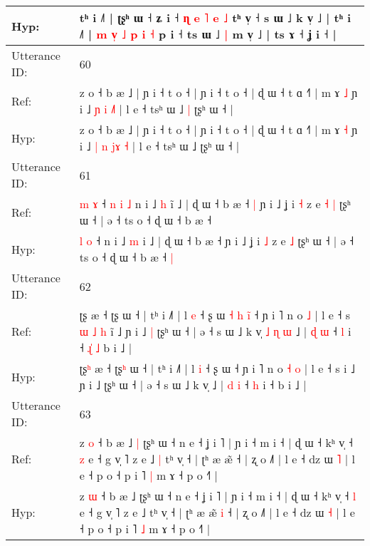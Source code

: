 \documentclass[10pt]{article}
\DeclareRobustCommand{\hl}[1]{{\textcolor{red}{#1}}}
\begin{document}
\begin{longtable}{ll}
 \\
Hyp: & tʰ i ˩˥ | ʈʂʰ ɯ ˧ ʑ i ˧\hl{}\hl{}\hl{} \hl{ɳ} \hl{e} \hl{˥} \hl{e} \hl{˩} tʰ v̩ ˧ s ɯ ˩ k v̩ ˩ | tʰ i ˩˥ |\hl{ }\hl{m}\hl{ }\hl{v}\hl{̩} \hl{˩} \hl{p} \hl{i} \hl{˧} p i ˧ ts ɯ ˩\hl{ }\hl{|} m v̩ ˩ | ts ɤ ˧ ʝ i ˧ |
 \\
\midrule
Utterance ID: & 60 \\
Ref: & z o ˧ b æ ˩ | ɲ i ˧ t o ˧ | ɲ i ˧ t o ˧ | ɖ ɯ ˧ t ɑ ˧˥ | m ɤ \hl{˩} ɲ i ˩ \hl{ɲ} \hl{i} \hl{}\hl{}\hl{˩}\hl{˥} | l e ˧ tsʰ ɯ ˩\hl{ }\hl{|} ʈʂʰ ɯ ˧ |
 \\
Hyp: & z o ˧ b æ ˩ | ɲ i ˧ t o ˧ | ɲ i ˧ t o ˧ | ɖ ɯ ˧ t ɑ ˧˥ | m ɤ \hl{˧} ɲ i ˩ \hl{|} \hl{n} \hl{j}\hl{ɤ}\hl{ }\hl{˧} | l e ˧ tsʰ ɯ ˩\hl{}\hl{} ʈʂʰ ɯ ˧ |
 \\
\midrule
Utterance ID: & 61 \\
Ref: & \hl{m} \hl{ɤ} ˧\hl{ }\hl{n}\hl{ }\hl{i}\hl{ }\hl{˩} n i ˩ \hl{h} i\hl{̃} ˩ | ɖ ɯ ˧ b æ ˧\hl{ }\hl{|} ɲ i ˩ ʝ i \hl{˧} z e\hl{ }\hl{˧} \hl{|} ʈʂʰ ɯ ˧ | ə ˧ ts o ˧ ɖ ɯ ˧ b æ ˧\hl{}\hl{}
 \\
Hyp: & \hl{l} \hl{o} ˧\hl{}\hl{}\hl{}\hl{}\hl{}\hl{} n i ˩ \hl{m} i\hl{} ˩ | ɖ ɯ ˧ b æ ˧\hl{}\hl{} ɲ i ˩ ʝ i \hl{˩} z e\hl{}\hl{} \hl{˩} ʈʂʰ ɯ ˧ | ə ˧ ts o ˧ ɖ ɯ ˧ b æ ˧\hl{ }\hl{|}
 \\
\midrule
Utterance ID: & 62 \\
Ref: & ʈʂ\hl{} æ ˧ ʈʂ\hl{} ɯ ˧ | tʰ i ˩˥ | l \hl{e} ˧ ʂ ɯ\hl{ }\hl{˧}\hl{ }\hl{h}\hl{ }\hl{i}\hl{̃} ˧ ɲ i ˥ n o\hl{}\hl{} \hl{˩} | l e ˧ s\hl{ }\hl{ɯ}\hl{ }\hl{˩}\hl{ }\hl{h} i\hl{̃} ˩ ɲ i ˩\hl{ }\hl{|} ʈʂʰ ɯ ˧ | ə ˧ s ɯ ˩ k v̩\hl{ }\hl{˩}\hl{ }\hl{ɳ}\hl{ }\hl{ɯ} ˩ | \hl{ɖ} \hl{ɯ} ˧ \hl{l} i ˧\hl{ }\hl{ɻ}\hl{̍}\hl{ }\hl{˩} b i ˩ |
 \\
Hyp: & ʈʂ\hl{ʰ} æ ˧ ʈʂ\hl{ʰ} ɯ ˧ | tʰ i ˩˥ | l \hl{i} ˧ ʂ ɯ\hl{}\hl{}\hl{}\hl{}\hl{}\hl{}\hl{} ˧ ɲ i ˥ n o\hl{ }\hl{˧} \hl{o} | l e ˧ s\hl{}\hl{}\hl{}\hl{}\hl{}\hl{} i\hl{} ˩ ɲ i ˩\hl{}\hl{} ʈʂʰ ɯ ˧ | ə ˧ s ɯ ˩ k v̩\hl{}\hl{}\hl{}\hl{}\hl{}\hl{} ˩ | \hl{d} \hl{i} ˧ \hl{h} i ˧\hl{}\hl{}\hl{}\hl{}\hl{} b i ˩ |
 \\
\midrule
Utterance ID: & 63 \\
Ref: & z \hl{o} ˧ b æ ˩\hl{ }\hl{|} ʈʂʰ ɯ ˧ n e ˧ ʝ i ˥ | ɲ i ˧ m i ˧ | ɖ ɯ ˧ kʰ v̩ ˧ \hl{z} e ˧ g v̩ ˥ z e ˩\hl{ }\hl{|} tʰ v̩ ˧ | ʈʰ æ æ̃\hl{}\hl{} ˧ | ʐ o ˩˥ | l e ˧ dz ɯ \hl{˥} | l e ˧ p o ˧ p i ˥ \hl{|} m ɤ ˧ p o ˧˥ |
 \\
Hyp: & z \hl{ɯ} ˧ b æ ˩\hl{}\hl{} ʈʂʰ ɯ ˧ n e ˧ ʝ i ˥ | ɲ i ˧ m i ˧ | ɖ ɯ ˧ kʰ v̩ ˧ \hl{l} e ˧ g v̩ ˥ z e ˩\hl{}\hl{} tʰ v̩ ˧ | ʈʰ æ æ̃\hl{ }\hl{i} ˧ | ʐ o ˩˥ | l e ˧ dz ɯ \hl{˧} | l e ˧ p o ˧ p i ˥ \hl{˩} m ɤ ˧ p o ˧˥ |

\end{longtable}
\end{document}

